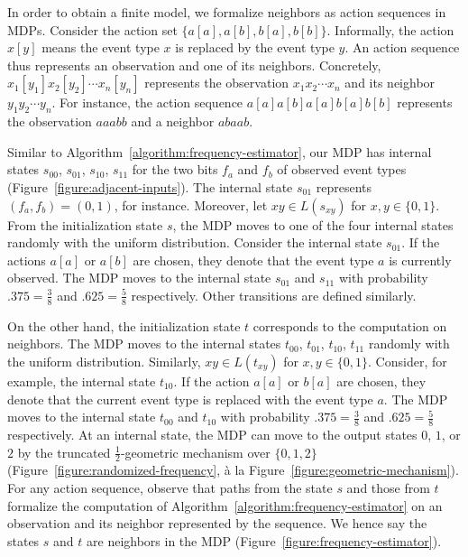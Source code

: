 In order to obtain a finite model, we formalize neighbors as action
sequences in MDPs. Consider the action set $\{
a[a], a[b], b[a], b[b] \}$. Informally, the action $x[y]$ means the
event type $x$ is replaced by the event type $y$. An
action sequence thus represents an observation and one of its
neighbors. Concretely, 
$x_1[y_1]x_2[y_2]\cdots x_n[y_n]$ represents the observation
$x_1x_2\cdots x_n$ and its neighbor $y_1y_2\cdots y_n$. For instance,
the action sequence $a[a]a[b]a[a]b[a]b[b]$ represents the observation
$aaabb$ and a neighbor $abaab$.

Similar to Algorithm~\ref{algorithm:frequency-estimator}, our MDP has internal states $s_{00}$, $s_{01}$, $s_{10}$,
$s_{11}$ for the two bits $f_a$ and $f_b$ of observed event types
(Figure~\ref{figure:adjacent-inputs}). The internal state $s_{01}$
represents $(f_a, f_b) = (0, 1)$, for instance. Moreover, let $xy \in
L (s_{xy})$ for $x, y \in \{ 0, 1 \}$. From the
initialization state $s$, the MDP moves to one of
the four internal states randomly with the uniform
distribution. Consider the internal state $s_{01}$. If the actions $a[a]$
or $a[b]$ are chosen, they denote that the event type $a$ is currently
observed. The MDP moves to the internal state $s_{01}$
and $s_{11}$ with probability $.375 = \frac{3}{8}$ and $.625 =
\frac{5}{8}$ respectively. Other transitions are defined similarly.

On the other hand, the initialization state $t$
corresponds to the computation on neighbors. The MDP moves to the internal states $t_{00}$,
$t_{01}$, $t_{10}$, $t_{11}$ randomly with
the uniform distribution. Similarly, $xy \in L (t_{xy})$ for $x, y \in
\{ 0, 1 \}$.
Consider, for example, the internal state
$t_{10}$. If the action $a[a]$ or $b[a]$ are chosen, they
denote that the current event type is replaced with the event type
$a$. The MDP moves to the internal state
$t_{00}$ and $t_{10}$ with probability $.375 =
\frac{3}{8}$ and $.625 = \frac{5}{8}$ respectively. At an internal
state, the MDP can move to the output states $0$,
$1$, or $2$ by the truncated $\frac{1}{2}$-geometric mechanism over
$\{ 0, 1, 2 \}$ (Figure~\ref{figure:randomized-frequency}, \`{a} la
Figure~\ref{figure:geometric-mechanism}). For any action sequence,
observe that paths from the state $s$ and those from $t$
formalize the computation of Algorithm~\ref{algorithm:frequency-estimator}
on an observation and its neighbor represented by the sequence. We
hence say the states $s$ and $t$ are neighbors in the
MDP (Figure~\ref{figure:frequency-estimator}).

